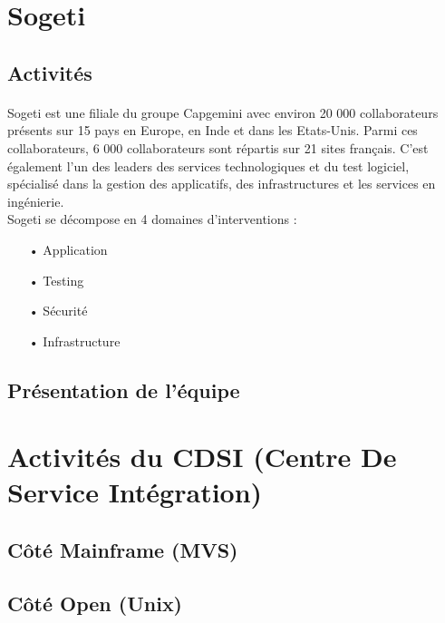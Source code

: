 \documentclass[a4paper,12pt]{report}
\begin{document}
\newpage
\section{Sogeti}
	\subsection{Activités}
	\paragraph*{}
	Sogeti est une filiale du groupe Capgemini avec environ 20 000 collaborateurs présents sur 15 pays en Europe, en Inde et dans les Etats-Unis. Parmi ces collaborateurs, 6 000 collaborateurs sont répartis sur 21 sites français. C'est également l’un des leaders des services technologiques et du test logiciel, spécialisé dans la gestion des applicatifs, des infrastructures et les services en ingénierie.\\
	Sogeti se décompose en 4 domaines d'interventions :\\
	\begin{itemize}
		\item[•] Application
		\item[•] Testing
		\item[•] Sécurité
		\item[•] Infrastructure
	\end{itemize}
	
	\subsection{Présentation de l'équipe}
	\paragraph*{}
	
	
\newpage	
\section{Activités du CDSI (Centre De Service Intégration)}
	\subsection{Côté Mainframe (MVS)}
	\paragraph*{}
	
	
	\subsection{Côté Open (Unix)}
\end{document}
